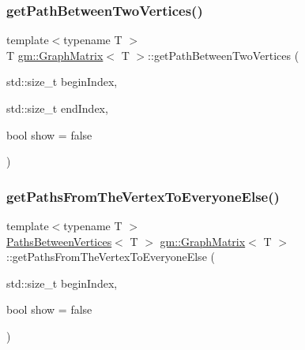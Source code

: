 \mbox{\label{classgm_1_1_graph_matrix_aff0a3d3adbdcc6bce105e8c10f422a4b}} 
\subsubsection{\texorpdfstring{get\+Path\+Between\+Two\+Vertices()}{getPathBetweenTwoVertices()}}
{\footnotesize\ttfamily template$<$typename T $>$ \\
T \mbox{\hyperlink{classgm_1_1_graph_matrix}{gm\+::\+Graph\+Matrix}}$<$ T $>$\+::get\+Path\+Between\+Two\+Vertices (\begin{DoxyParamCaption}\item[{std\+::size\+\_\+t}]{begin\+Index,  }\item[{std\+::size\+\_\+t}]{end\+Index,  }\item[{bool}]{show = {\ttfamily false} }\end{DoxyParamCaption})}

\mbox{\label{classgm_1_1_graph_matrix_a2eb3d434634993733dfd8fb7515ca8b9}} 
\subsubsection{\texorpdfstring{get\+Paths\+From\+The\+Vertex\+To\+Everyone\+Else()}{getPathsFromTheVertexToEveryoneElse()}}
{\footnotesize\ttfamily template$<$typename T $>$ \\
\mbox{\hyperlink{structpbv_1_1_paths_between_vertices}{Paths\+Between\+Vertices}}$<$ T $>$ \mbox{\hyperlink{classgm_1_1_graph_matrix}{gm\+::\+Graph\+Matrix}}$<$ T $>$\+::get\+Paths\+From\+The\+Vertex\+To\+Everyone\+Else (\begin{DoxyParamCaption}\item[{std\+::size\+\_\+t}]{begin\+Index,  }\item[{bool}]{show = {\ttfamily false} }\end{DoxyParamCaption})}


